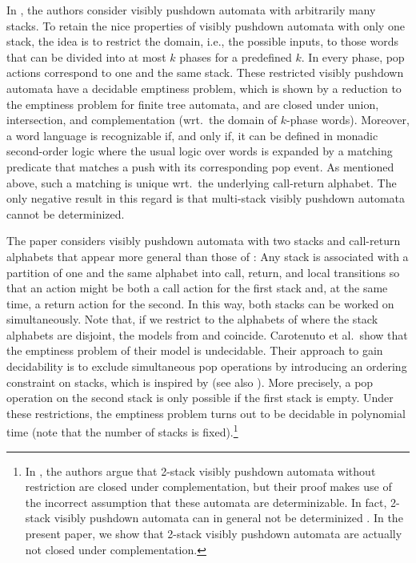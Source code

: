 \documentclass{LMCS}
\begin{document}
In \cite{Madhusudan2007}, the authors consider visibly pushdown automata with
arbitrarily many stacks. To retain the nice properties of visibly pushdown
automata with only one stack, the idea is to restrict the domain, i.e., the
possible inputs, to those words that can be divided into at most $k$ phases
for a predefined $k$. In every phase, pop actions correspond to one and the
same stack. These restricted visibly pushdown automata have a decidable
emptiness problem, which is shown by a reduction to the emptiness problem for
finite tree automata, and are closed under union, intersection, and
complementation (wrt.\ the domain of $k$-phase words). Moreover, a word
language is recognizable if, and only if, it can be defined in monadic
second-order logic where the usual logic over words is expanded by a matching
predicate that matches a push with its corresponding pop event. As mentioned
above, such a matching is unique wrt.\ the underlying call-return alphabet.
The only negative result in this regard is that multi-stack visibly pushdown
automata cannot be determinized.

The paper \cite{Murano2007} considers visibly pushdown automata with two
stacks and call-return alphabets that appear more general than those of
\cite{Madhusudan2007}: Any stack is associated with a partition of one and the
same alphabet into call, return, and local transitions so that an action might
be both a call action for the first stack and, at the same time, a return
action for the second. In this way, both stacks can be worked on
simultaneously. Note that, if we restrict to the alphabets of
\cite{Madhusudan2007} where the stack alphabets are disjoint, the models from
\cite{Murano2007} and \cite{Madhusudan2007} coincide. Carotenuto et al.\ show
that the emptiness problem of their model is undecidable. Their approach to
gain decidability is to exclude simultaneous pop operations by introducing an
ordering constraint on stacks, which is inspired by \cite{multi96} (see also
\cite{ABH-dlt08}). More precisely, a pop operation on the second stack is only
possible if the first stack is empty. Under these restrictions, the emptiness
problem turns out to be decidable in polynomial time (note that the number of
stacks is fixed).\footnote{In \cite{Murano2007}, the authors argue that
  2-stack visibly pushdown automata without restriction are closed under
  complementation, but their proof makes use of the incorrect assumption that
  these automata are determinizable. In fact, \mbox{2-stack} visibly pushdown
  automata can in general not be determinized \cite{Madhusudan2007}. In the
  present paper, we show that 2-stack visibly pushdown automata are actually
  not closed under complementation.}
\end{document}
